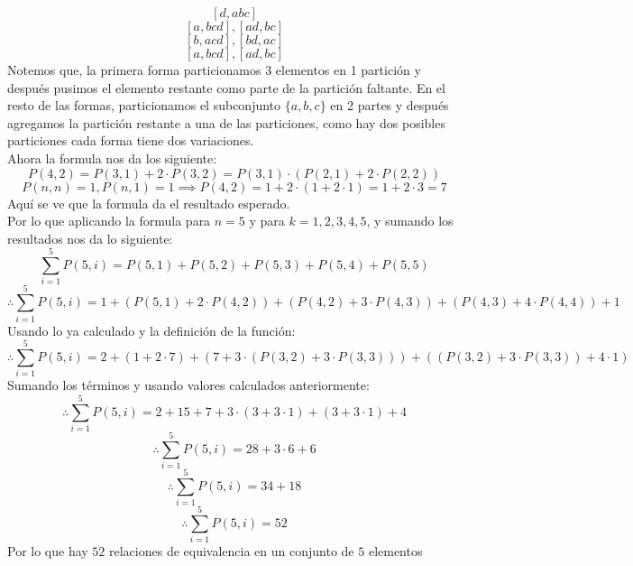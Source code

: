 \documentclass[11pt]{article}
\begin{document}
\[ [d, abc] \]
\[ [a, bcd], [ad, bc] \]
\[ [b, acd], [bd, ac] \]
\[ [a, bcd], [ad, bc] \]
Notemos que, la primera forma particionamos 3 elementos en 1 partición y después pusimos el elemento restante como parte de la partición faltante. En el resto de las formas, particionamos el subconjunto $\{a,b,c\}$ en 2 partes y después agregamos la partición restante a una de las particiones, como hay dos posibles particiones cada forma tiene dos variaciones.\\
Ahora la formula nos da los siguiente:
\[P(4,2)=P(3,1)+2\cdot P(3,2)=P(3,1)\cdot (P(2,1)+2\cdot P(2,2))\]
\[P(n,n)=1,P(n,1)=1\implies P(4,2)=1+2\cdot (1+2\cdot 1)=1+2\cdot 3=7\]
Aquí se ve que la formula da el resultado esperado.\\
Por lo que aplicando la formula para $n=5$ y para $k=1,2,3,4,5$, y sumando los resultados nos da lo siguiente:
\[
\sum_{i=1}^5P(5,i)=P(5,1)+P(5,2)+P(5,3)+P(5,4)+P(5,5)
\]
\[
\therefore \sum_{i=1}^5P(5,i)=1+\left(P(5,1)+2\cdot P(4,2)\right)+\left(P(4,2)+3\cdot P(4,3)\right)+\left(P(4,3)+4\cdot P(4,4)\right)+1
\]
Usando lo ya calculado y la definición de la función:
\[
\therefore \sum_{i=1}^5P(5,i)=2+\left(1+2\cdot 7\right)+\left(7+3\cdot \left(P(3,2)+3\cdot P(3,3)\right)\right)+\left(\left(P(3,2)+3\cdot P(3,3)\right)+4\cdot 1\right)
\]
Sumando los términos y usando valores calculados anteriormente:
\[
\therefore \sum_{i=1}^5P(5,i)=2+15+7+3\cdot \left(3+3\cdot 1\right)+\left(3+3\cdot 1\right)+4
\]
\[
\therefore \sum_{i=1}^5P(5,i)=28+3\cdot 6+6
\]
\[
\therefore \sum_{i=1}^5P(5,i)=34+18
\]
\[
\therefore \sum_{i=1}^5P(5,i)=52
\]
Por lo que hay $52$ relaciones de equivalencia en un conjunto de $5$ elementos
\end{document}
